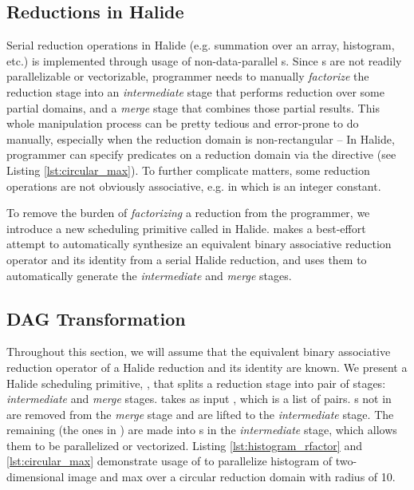 \subsection{Reductions in Halide}

Serial reduction operations in Halide (e.g. summation over an array, histogram, etc.) is implemented through usage of non-data-parallel s. Since s are not readily parallelizable or vectorizable, programmer needs to manually \emph{factorize} the reduction stage into an \emph{intermediate} stage that performs reduction over some partial domains, and a \emph{merge} stage that combines those partial results. This whole manipulation process can be pretty tedious and error-prone to do manually, especially when the reduction domain is non-rectangular -- In Halide, programmer can specify predicates on a reduction domain via the  directive (see Listing \ref{lst:circular_max}). To further complicate matters, some reduction operations are not obviously associative, e.g.  in which  is an integer constant.

To remove the burden of \emph{factorizing} a reduction from the programmer, we introduce a new scheduling primitive called  in Halide.  makes a best-effort attempt to automatically synthesize an equivalent binary associative reduction operator and its identity from a serial Halide reduction, and uses them to automatically generate the \emph{intermediate} and \emph{merge} stages.

\subsection{ DAG Transformation}

Throughout this section, we will assume that the equivalent binary associative reduction operator of a Halide reduction and its identity are known. We present a Halide scheduling primitive, , that splits a reduction stage into pair of stages: \emph{intermediate} and \emph{merge} stages.  takes as input , which is a list of  pairs. s not in  are removed from the \emph{merge} stage and are lifted to the \emph{intermediate} stage. The remaining  (the ones in ) are made into s in the \emph{intermediate} stage, which allows them to be parallelized or vectorized. Listing \ref{lst:histogram_rfactor} and \ref{lst:circular_max} demonstrate usage of  to parallelize histogram of two-dimensional image and max over a circular reduction domain with radius of 10. 

